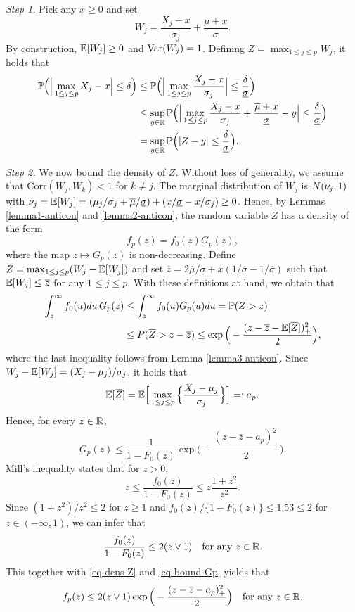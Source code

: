 \textit{Step 1.} %
Pick any $x \ge 0$ and set 
\[ W_j = \frac{X_j - x}{\sigma_j} + \frac{\overline{\mu} + x}{\underline{\sigma}}. \]
By construction, $\mathbb{E}[W_j] \ge 0$ and $\textnormal{Var}(W_j) = 1$. Defining $Z = \max_{1 \le j \le p} W_j$, it holds that  
\begin{align*}
\mathbb{P} \Big( \Big| \max_{1 \le j \le p} X_j - x \Big| \le \delta \Big) 
 & \le \mathbb{P} \Big( \Big| \max_{1 \le j \le p} \frac{X_j - x}{\sigma_j} \Big| \le \frac{\delta}{\underline{\sigma}} \Big) \\
 & \le \sup_{y \in \mathbb{R}} \mathbb{P} \Big( \Big| \max_{1 \le j \le p} \frac{X_j - x}{\sigma_j} + \frac{\overline{\mu} + x}{\underline{\sigma}} - y \Big| \le \frac{\delta}{\underline{\sigma}} \Big) \\
 & = \sup_{y \in \mathbb{R}} \mathbb{P} \Big( |Z - y| \le \frac{\delta}{\underline{\sigma}} \Big). 
\end{align*}


\textit{Step 2.} We now bound the density of $Z$. Without loss of generality, we assume that $\text{Corr}(W_j,W_k) < 1$ for $k \ne j$. The marginal distribution of $W_j$ is $N(\nu_j,1)$ with $\nu_j = \mathbb{E}[W_j] = (\mu_j/\sigma_j + \overline{\mu}/{\underline{\sigma}}) + (x/\underline{\sigma} - x/\sigma_j) \ge 0$. Hence, by Lemmas \ref{lemma1-anticon} and \ref{lemma2-anticon}, the random variable $Z$ has a density of the form
\begin{equation}\label{eq-dens-Z}
f_p(z) = f_0(z) G_p(z), 
\end{equation}
where the map $z \mapsto G_p(z)$ is non-decreasing. Define $\overline{Z} = \max_{1 \le j \le p} (W_j - \mathbb{E}[W_j])$ and set $\overline{z} = 2 \overline{\mu}/\underline{\sigma} + x(1/\underline{\sigma} - 1/\overline{\sigma})$ such that $\mathbb{E}[W_j] \le \overline{z}$ for any $1 \le j \le p$. With these definitions at hand, we obtain that  
\begin{align*}
\int_z^{\infty} f_0(u)du \, G_p(z) & \le \int_z^{\infty} f_0(u) G_p(u) du = \mathbb{P}(Z > z) \\ 
 & \le P(\overline{Z} > z - \overline{z}) \le \exp \Big( - \frac{(z - \overline{z} - \mathbb{E}[\overline{Z}])^2_+}{2} \Big), 
\end{align*}
where the last inequality follows from Lemma \ref{lemma3-anticon}. Since $W_j - \mathbb{E}[W_j] = (X_j - \mu_j)/\sigma_j$, it holds that 
\[ \mathbb{E}[\overline{Z}] = \mathbb{E} \Big[ \max_{1 \le j \le p} \Big\{ \frac{X_j-\mu_j}{\sigma_j} \Big\} \Big] =: a_p. \]
Hence, for every $z \in \mathbb{R}$, 
\begin{equation}\label{eq-bound-Gp}
G_p(z) \le \frac{1}{1 - F_0(z)} \exp\Big( - \frac{(z - \overline{z} - a_p)_+^2}{2} \Big). 
\end{equation}
Mill's inequality states that for $z > 0$, 
\[ z \le \frac{f_0(z)}{1-F_0(z)} \le z \frac{1+z^2}{z^2}. \]
Since $(1+z^2)/z^2 \le 2$ for $z \ge 1$ and $f_0(z)/\{1-F_0(z)\} \le 1.53 \le 2$ for $z \in (-\infty,1)$, we can infer that
\[ \frac{f_0(z)}{1-F_0(z)} \le 2 (z \vee 1) \quad \text{for any } z \in \mathbb{R}. \]
This together with \eqref{eq-dens-Z} and \eqref{eq-bound-Gp} yields that
\[ f_p(z) \le 2 (z \vee 1)  \exp\Big( - \frac{(z - \overline{z} - a_p)_+^2}{2} \Big) \quad \text{for any } z \in \mathbb{R}. \]
 

